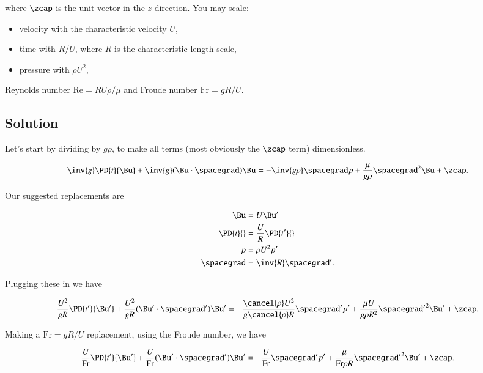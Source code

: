 where $\zcap$ is the unit vector in the $z$ direction.  You may scale:

\begin{itemize}
\item velocity with the characteristic velocity $U$,
\item time with $R/U$, where $R$ is the characteristic length scale,
\item pressure with $\rho U^2$,
\end{itemize}

Reynolds number $\text{Re} = R U \rho/ \mu$ and Froude number $\text{Fr} = g R/U$.

\subsection{Solution}

Let's start by dividing by $g \rho$, to make all terms (most obviously the $\zcap$ term) dimensionless.

\begin{equation}\label{eqn:continuumL19:250}
\inv{g} \PD{t}{\Bu} + \inv{g} (\Bu \cdot \spacegrad) \Bu = - \inv{g \rho} \spacegrad p + \frac{\mu}{g \rho} \spacegrad^2 \Bu + \zcap.
\end{equation}

Our suggested replacements are

\begin{align}\label{eqn:continuumProblemSet3:270}
\Bu &= U \Bu' \\
\PD{t}{} &= \frac{U}{R} \PD{t'}{} \\
p &= \rho U^2 p' \\
\spacegrad &= \inv{R} \spacegrad'.
\end{align}

Plugging these in we have

\begin{equation}\label{eqn:continuumL19:290}
\frac{U^2}{g R} \PD{t'}{\Bu'} + \frac{U^2}{g R} (\Bu' \cdot \spacegrad') \Bu' = - \frac{\cancel{\rho} U^2}{g \cancel{\rho} R} \spacegrad' p' + \frac{\mu U}{g \rho R^2} {\spacegrad'}^2 \Bu' + \zcap.
\end{equation}

Making a $\text{Fr} = gR/U$ replacement, using the Froude number, we have

\begin{equation}\label{eqn:continuumL19:310}
\frac{U}{\text{Fr}} \PD{t'}{\Bu'} + \frac{U}{\text{Fr}} (\Bu' \cdot \spacegrad') \Bu' = - \frac{U}{\text{Fr}} \spacegrad' p' + \frac{\mu }{\text{Fr} \rho R} {\spacegrad'}^2 \Bu' + \zcap.
\end{equation}

